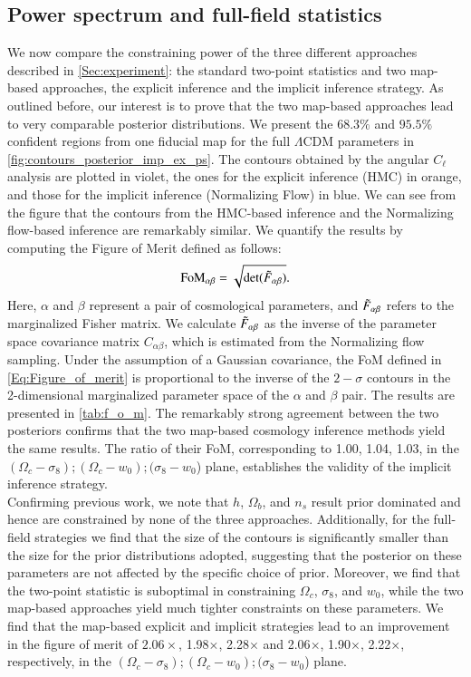 \documentclass{aa}
\begin{document}
\subsection{Power spectrum and full-field statistics}
We now compare the constraining power of the three different approaches described in \autoref{Sec:experiment}: the standard two-point statistics and two map-based approaches, the explicit inference and the implicit inference strategy. 
As outlined before, our interest is to prove that the two map-based approaches lead to very comparable posterior distributions. We present the $68.3\%$ and $95.5\%$ confident regions from one fiducial map for the full $\Lambda$CDM parameters in \autoref{fig:contours_posterior_imp_ex_ps}. The contours obtained by the angular $C_{\ell}$ analysis are plotted in violet, the ones for the explicit inference (HMC) in orange, and those for the implicit inference (Normalizing Flow) in blue. 
We can see from the figure that the contours from the HMC-based inference and the Normalizing flow-based inference are remarkably similar.  We quantify the results by computing the Figure of Merit defined as follows:
\begin{equation}\label{Eq:Figure_of_merit}
    \text{FoM}_{\alpha \beta}=\sqrt{\text{det}(\Tilde{F}_{\alpha \beta})}.
\end{equation}
Here, $\alpha$ and $\beta$ represent a pair of cosmological parameters, and $\Tilde{F}_{\alpha \beta}$ refers to the marginalized Fisher matrix. We calculate $\Tilde{F}_{\alpha \beta}$ as the inverse of the parameter space covariance matrix $C_{\alpha \beta}$, which is estimated from the Normalizing flow sampling. 
Under the assumption of a Gaussian covariance, the FoM defined in \autoref{Eq:Figure_of_merit} is proportional to the inverse of the $2-\sigma$ contours in the 2-dimensional marginalized parameter space of the $\alpha$ and $\beta$ pair.
The results are presented in \autoref{tab:f_o_m}.
The remarkably strong agreement between the two posteriors confirms that the two map-based cosmology inference methods yield the same results. The ratio of their FoM, corresponding to 1.00, 1.04, 1.03, in the $(\Omega_c-\sigma_8); (\Omega_c-w_0); (\sigma_8-w_0$) plane, establishes the validity of the implicit inference strategy. \\
Confirming previous work, we note that $h$, $\Omega_b$, and $n_s$ result prior dominated and hence are constrained by none of the three approaches. 
Additionally, for the full-field strategies we find that the size of the contours is significantly smaller than the size for the prior distributions adopted, suggesting that the 
posterior on these parameters are not affected by the specific choice of prior.
Moreover, we find that the two-point statistic is suboptimal in constraining $\Omega_c$, $\sigma_8$, and $w_0$, while the two map-based approaches yield much tighter constraints on these parameters. 
We find that the map-based explicit and implicit strategies lead to an improvement in the figure of merit of $2.06\times$, 1.98$\times$, 2.28$\times$ and 2.06$\times$, 1.90$\times$, 2.22$\times$, respectively, in the $(\Omega_c-\sigma_8); (\Omega_c-w_0); (\sigma_8-w_0$) plane.
\end{document}
